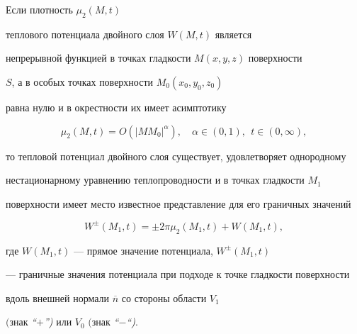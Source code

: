 \begin{thm}


Если плотность $\mu_2(M,t)$


теплового потенциала двойного слоя $W ({M,t})$ является 


непрерывной функцией в точках гладкости $M ({x,y,z})$ поверхности 


$S$, а в особых точках поверхности $M_{0} ({x_{0} ,y_{0} ,z_{0}})$


равна нулю и в окрестности их имеет асимптотику


\begin{equation}


\label{eq8}


\mu_{2} ({M,t})=O ({| {MM_{0}} |^{\alpha}} 


),\quad \alpha \in ({0,1}),\ \ t \in ({0,\infty}),


\end{equation}


то тепловой потенциал двойного слоя существует, удовлетворяет однородному 


нестационарному уравнению теплопроводности и в точках гладкости $M_{1} $ 


поверхности имеет место известное представление для его граничных значений


\begin{equation}


\label{eq9}


W^{\pm} ({M_{1} ,t})=\pm 2\pi \mu_{2} ({M_{1} ,t})+W ({M_{1} ,t}),


\end{equation}


где $W ({M_{1} ,t})$ --- прямое значение потенциала, $W^{\pm} ({M_{1} ,t})$


--- граничные значения потенциала при подходе к точке гладкости поверхности 


вдоль внешней нормали $\overline {n}$ со стороны области $V_{1}$


$($знак {\em ``$+$'')} или $V_{0}$ $($знак {\em ``$-$``)}.


\end{thm}








